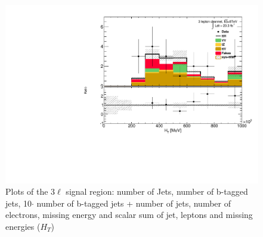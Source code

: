 \begin{figure}[!htbp]
\begin{minipage}[h]{0.5\textwidth}
    \centering \includegraphics[width=\textwidth]{figs/results/plotCand_3lep_HT}
  \end{minipage}\hfill
\caption{Plots of the 3$\ell$ signal region: number of Jets, number of b-tagged jets, 10$\cdot$ number of b-tagged jets + number of jets, number of electrons, missing energy and scalar sum of jet, leptons and missing energies ($H_T$) } 
\label{figure:results_3l_event}
\end{figure} 

